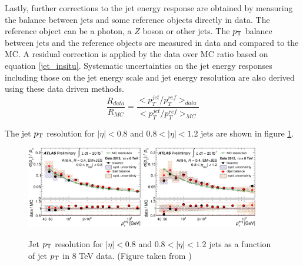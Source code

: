 \indent Lastly, further corrections to the jet energy response are obtained by measuring the balance between jets and some reference objects directly in data. \cite{JES_ZGamma,JES_dijet}  The reference object can be a photon, a $Z$ boson or other jets.  The $p_{\mathrm{T}}$ balance between jets and the reference objects are measured in data and compared to the MC.  A residual correction is applied by the data over MC ratio based on equation \ref{jet_insitu}.  Systematic uncertainties on the jet energy responses including those on the jet energy scale and jet energy resolution are also derived using these data driven methods. \\

\begin{equation}
\frac{R_{data}}{R_{MC}} = \frac{<p_T^{jet}/p_T^{ref}>_{data}}{<p_T^{jet}/p_T^{ref}>_{MC}}
\label{eqn:jet_insitu}
\end{equation}

\indent The jet $p_{\mathrm{T}}$ resolution for $|\eta|<0.8$ and $0.8<|\eta|<1.2$ jets are shown in figure \ref{fig:jet_ptresolution}.\cite{JES_dijet} \\

\begin{figure}[htb]
  \begin{center}
    \includegraphics[width=0.45\textwidth]{figures/JetCalib/JetCentral_Response.png}\hspace{0.05\textwidth}
    \includegraphics[width=0.45\textwidth]{figures/JetCalib/JetTransition_Response.png}\hspace{0.05\textwidth}
\end{center}
\caption{Jet $p_{\mathrm{T}}$ resolution for $|\eta|<0.8$ and $0.8<|\eta|<1.2$ jets as a function of jet $p_{\mathrm{T}}$ in 8 TeV data. (Figure taken from \cite{JES_dijet}) }
\label{fig:jet_ptresolution} 
\end{figure}

